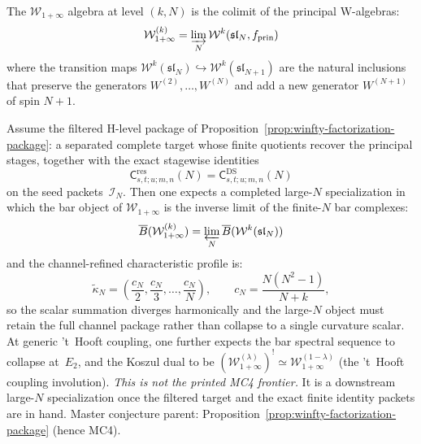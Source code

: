 \begin{definition}
\label{def:w-infty}
The $\mathcal{W}_{1+\infty}$ algebra at level $(k, N)$ is the
colimit of the principal W-algebras:
\[
\mathcal{W}_{1+\infty}^{(k)}
= \varinjlim_{N} \mathcal{W}^k(\mathfrak{sl}_N, f_{\mathrm{prin}})
\]
where the transition maps
$\mathcal{W}^k(\mathfrak{sl}_N) \hookrightarrow
\mathcal{W}^k(\mathfrak{sl}_{N+1})$ are the natural inclusions
that preserve the generators $W^{(2)}, \ldots, W^{(N)}$ and add a
new generator $W^{(N+1)}$ of spin $N+1$.
\end{definition}

\begin{conjecture}
\label{conj:w-infty-bar}
Assume the filtered H-level package of
Proposition~\ref{prop:winfty-factorization-package}: a separated
complete target whose finite quotients recover the principal stages,
together with the exact stagewise identities
\[
\mathsf{C}^{\mathrm{res}}_{s,t;u;m,n}(N)
=
\mathsf{C}^{\mathrm{DS}}_{s,t;u;m,n}(N)
\]
on the seed packets~$\mathcal{I}_N$.  Then one expects a completed
large-$N$ specialization in which the bar object of
$\mathcal{W}_{1+\infty}$ is the inverse limit of the finite-$N$ bar
complexes:
\begin{equation}\label{eq:w-infty-bar}
\overline{B}(\mathcal{W}_{1+\infty}^{(k)})
= \varprojlim_{N} \overline{B}(\mathcal{W}^k(\mathfrak{sl}_N))
\end{equation}
and the channel-refined characteristic profile is:
\begin{equation}\label{eq:w-infty-curvature}
\widetilde{\kappa}_N
=
\left(\frac{c_N}{2},\frac{c_N}{3},\ldots,\frac{c_N}{N}\right),
\qquad c_N = \frac{N(N^2-1)}{N+k},
\end{equation}
so the scalar summation diverges harmonically and the large-$N$ object
must retain the full channel package rather than collapse to a single
curvature scalar.  At generic 't~Hooft coupling, one further expects
the bar spectral sequence to collapse at~$E_2$, and the Koszul dual to
be
$(\mathcal{W}_{1+\infty}^{(\lambda)})^!
\simeq \mathcal{W}_{1+\infty}^{(1-\lambda)}$
\textup{(}the 't~Hooft coupling involution\textup{)}.
\emph{This is not the printed MC4 frontier.}  It is a downstream
large-$N$ specialization once the filtered target and the exact finite
identity packets are in hand.
\textup{Master conjecture parent:}
Proposition~\textup{\ref{prop:winfty-factorization-package}}
\textup{(}hence MC4\textup{)}.
\end{conjecture}

